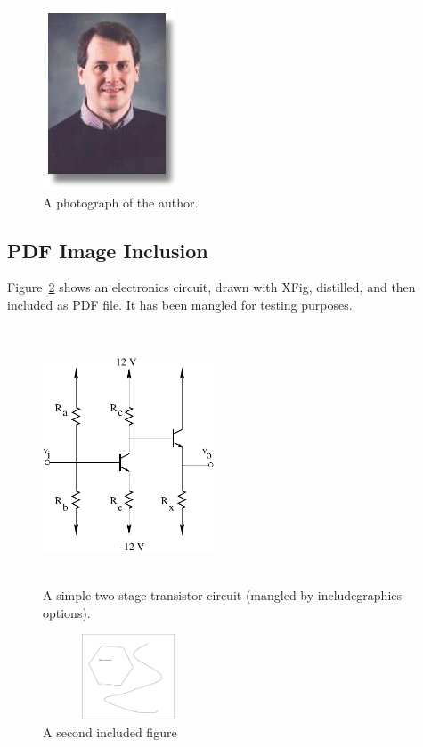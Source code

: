 \documentclass[dvipdfm]{article}
\begin{document}
\begin{figure}
  \begin{center}
    \includegraphics{mwicks.jpeg}
  \end{center}

  \caption{A photograph of the author.}
  \label{fig:author}
\end{figure}

\subsection{PDF Image Inclusion}
Figure~\ref{fig:circuit} shows
an electronics circuit,
drawn with XFig, distilled,
and then included as PDF file.
It has been mangled for testing purposes.
\begin{figure}
  \begin{center}
     \includegraphics[viewport=30 30 150 150,angle=20,width=2.0in,height=3.0in]{transistor}
  \end{center}

  \caption{A simple two-stage transistor circuit (mangled by includegraphics
options).}
  \label{fig:circuit}
\end{figure}

\begin{figure}
  \begin{center}
    \includegraphics[clip,angle=20,height=1.0in,width=2.0in]{something.eps}
  \end{center}

  \caption{A second included figure}
  \label{fig:something}
\end{figure}
\end{document}
